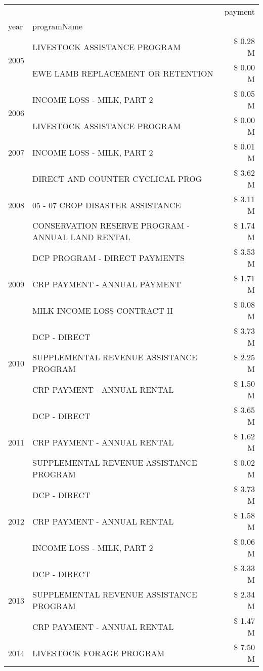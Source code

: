 \begin{tabular}{llr}
\toprule
 &  & payment \\
year & programName &  \\
\midrule
\multirow[t]{2}{*}{2005} & LIVESTOCK ASSISTANCE PROGRAM & \$ 0.28 M \\
 & EWE LAMB REPLACEMENT OR RETENTION & \$ 0.00 M \\
\cline{1-3}
\multirow[t]{2}{*}{2006} & INCOME LOSS - MILK, PART 2 & \$ 0.05 M \\
 & LIVESTOCK ASSISTANCE PROGRAM & \$ 0.00 M \\
\cline{1-3}
2007 & INCOME LOSS - MILK, PART 2 & \$ 0.01 M \\
\cline{1-3}
\multirow[t]{3}{*}{2008} & DIRECT AND COUNTER CYCLICAL PROG & \$ 3.62 M \\
 & 05 - 07 CROP DISASTER ASSISTANCE & \$ 3.11 M \\
 & CONSERVATION RESERVE PROGRAM - ANNUAL LAND RENTAL & \$ 1.74 M \\
\cline{1-3}
\multirow[t]{3}{*}{2009} & DCP PROGRAM - DIRECT PAYMENTS & \$ 3.53 M \\
 & CRP PAYMENT - ANNUAL PAYMENT & \$ 1.71 M \\
 & MILK INCOME LOSS CONTRACT II & \$ 0.08 M \\
\cline{1-3}
\multirow[t]{3}{*}{2010} & DCP - DIRECT & \$ 3.73 M \\
 & SUPPLEMENTAL REVENUE ASSISTANCE PROGRAM & \$ 2.25 M \\
 & CRP PAYMENT - ANNUAL RENTAL & \$ 1.50 M \\
\cline{1-3}
\multirow[t]{3}{*}{2011} & DCP - DIRECT & \$ 3.65 M \\
 & CRP PAYMENT - ANNUAL RENTAL & \$ 1.62 M \\
 & SUPPLEMENTAL REVENUE ASSISTANCE PROGRAM & \$ 0.02 M \\
\cline{1-3}
\multirow[t]{3}{*}{2012} & DCP - DIRECT & \$ 3.73 M \\
 & CRP PAYMENT - ANNUAL RENTAL & \$ 1.58 M \\
 & INCOME LOSS - MILK, PART 2 & \$ 0.06 M \\
\cline{1-3}
\multirow[t]{3}{*}{2013} & DCP - DIRECT & \$ 3.33 M \\
 & SUPPLEMENTAL REVENUE ASSISTANCE PROGRAM & \$ 2.34 M \\
 & CRP PAYMENT - ANNUAL RENTAL & \$ 1.47 M \\
\cline{1-3}
\multirow[t]{3}{*}{2014} & LIVESTOCK FORAGE PROGRAM & \$ 7.50 M \\

\end{tabular}
